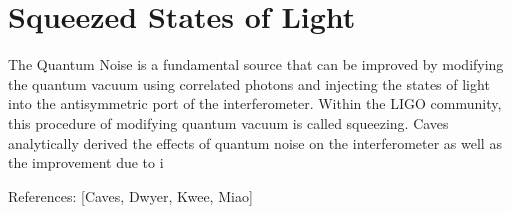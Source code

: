 	
	\section{Squeezed States of Light}
	The Quantum Noise is a fundamental source that can be improved by modifying the quantum vacuum using correlated photons and injecting the states of light into the antisymmetric port of the interferometer.  Within the LIGO community, this procedure of modifying quantum vacuum is called squeezing. Caves analytically derived the effects of quantum noise on the interferometer as well as the improvement due to i
	
	References: [Caves, Dwyer, Kwee, Miao]
	
